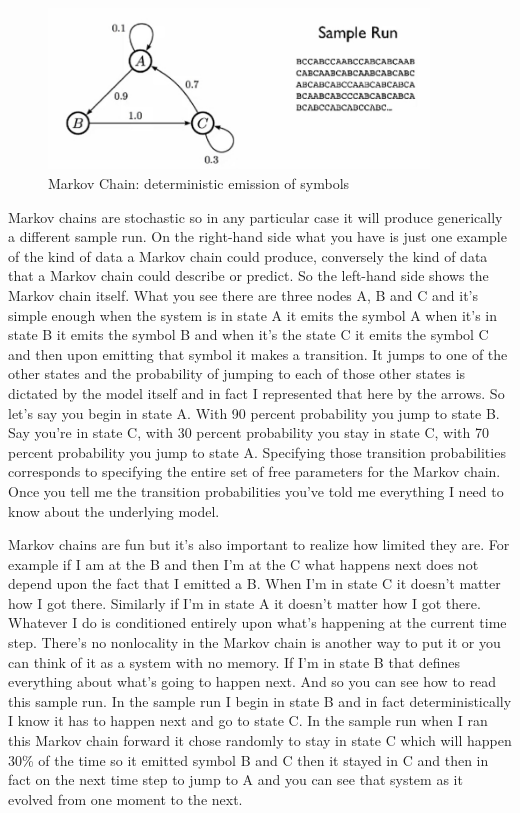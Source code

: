 \documentclass[]{article}
\begin{document}
\begin{figure}[H]
	\caption{Markov Chain: deterministic emission of symbols}\label{fig:markov1}
	\includegraphics[width=0.9\textwidth]{markov1}
\end{figure}

Markov chains are stochastic so in any
particular case it will produce
generically a different sample run. On
the right-hand side what you have is
just one example of the kind of data a
Markov chain could produce, conversely
the kind of data that a Markov chain
could describe or predict. So the
left-hand side shows the Markov chain
itself. What you see there are three
nodes A, B and C and it's simple enough
when the system is in state A it emits
the symbol A when it's in state B it
emits the symbol B and when it's the
state C it emits the symbol C and then
upon emitting that symbol it makes a
transition. It jumps to one of the other
states and the probability of jumping to
each of those other states is dictated
by the model itself and in fact I
represented that here by the arrows. So
let's say you begin in state A. With 90
percent probability you jump to state B.
Say you're in state C, with 30 percent
probability you stay in state C, with 70
percent probability you jump to state A.
Specifying those transition
probabilities corresponds to specifying
the entire set of free parameters for
the Markov chain. Once you tell me the
transition probabilities you've told me
everything I need to know about the
underlying model.

Markov chains are fun
but it's also important to realize how
limited they are. For example if I am at
the B and then I'm at the C what happens
next does not depend upon the fact that I
emitted a B. When I'm in state C it
doesn't matter how I got there. Similarly
if I'm in state A it doesn't matter how
I got there. Whatever I do is conditioned
entirely upon what's happening at the
current time step. There's no nonlocality
in the Markov chain is another way to
put it or you can think of it as a
system with no memory. If I'm in state B
that defines everything about what's
going to happen next.
And so you can see how to read this
sample run. In the sample run I begin
in state B and in fact deterministically
I know it has to happen next and go to
state C. In the sample run when I ran
this Markov chain forward it chose
randomly to stay in state C which will
happen 30\% of the time so it emitted
symbol B and C then it stayed in C and
then in fact on the next time step to
jump to A and you can see that system as
it evolved from one moment to the next.
\end{document}

